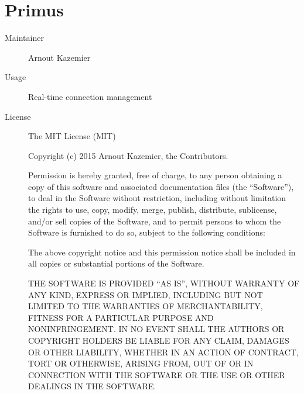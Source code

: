   \section*{Primus}
    \begin{description}
      \item[Maintainer] Arnout Kazemier
      \item[Usage] Real-time connection management
      \item[License] \scriptsize The MIT License (MIT)

        Copyright (c) 2015 Arnout Kazemier, the Contributors.

        Permission is hereby granted, free of charge, to any person obtaining a copy
        of this software and associated documentation files (the ``Software''), to deal
        in the Software without restriction, including without limitation the rights
        to use, copy, modify, merge, publish, distribute, sublicense, and/or sell
        copies of the Software, and to permit persons to whom the Software is
        furnished to do so, subject to the following conditions:

        The above copyright notice and this permission notice shall be included in all
        copies or substantial portions of the Software.

        THE SOFTWARE IS PROVIDED ``AS IS'', WITHOUT WARRANTY OF ANY KIND, EXPRESS OR
        IMPLIED, INCLUDING BUT NOT LIMITED TO THE WARRANTIES OF MERCHANTABILITY,
        FITNESS FOR A PARTICULAR PURPOSE AND NONINFRINGEMENT. IN NO EVENT SHALL THE
        AUTHORS OR COPYRIGHT HOLDERS BE LIABLE FOR ANY CLAIM, DAMAGES OR OTHER
        LIABILITY, WHETHER IN AN ACTION OF CONTRACT, TORT OR OTHERWISE, ARISING FROM,
        OUT OF OR IN CONNECTION WITH THE SOFTWARE OR THE USE OR OTHER DEALINGS IN THE
        SOFTWARE.
    \end{description}

